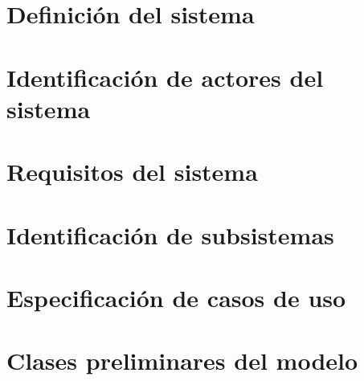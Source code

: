 \section{Definición del sistema}
\label{definicion_sistema}



\section{Identificación de actores del sistema}
\label{identificacion_actores}



\section{Requisitos del sistema}
\label{requisitos_sistema}



\section{Identificación de subsistemas}
\label{identificacion_subsistemas}



\section{Especificación de casos de uso}
\label{especificacion_casos_uso}



\section{Clases preliminares del modelo}
\label{clases_preliminares_modelo}
